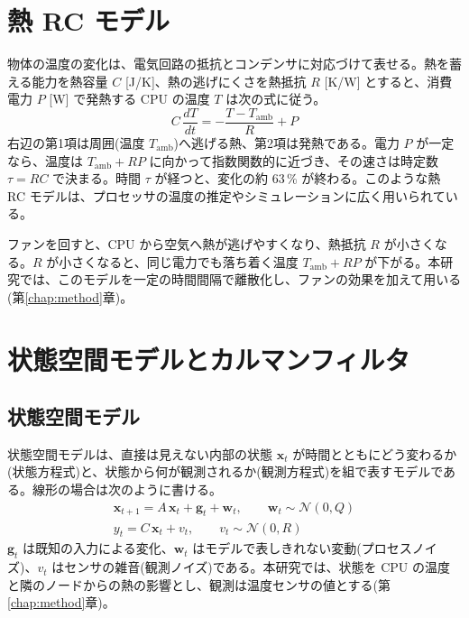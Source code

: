 \section{熱 RC モデル}\label{sec:bg-rc}
物体の温度の変化は、電気回路の抵抗とコンデンサに対応づけて表せる。熱を蓄える能力を熱容量 $C$ [J/K]、熱の逃げにくさを熱抵抗 $R$ [K/W] とすると、消費電力 $P$ [W] で発熱する CPU の温度 $T$ は次の式に従う。
\begin{equation}
  C\,\frac{dT}{dt} = -\frac{T - T_{\mathrm{amb}}}{R} + P
\end{equation}
右辺の第1項は周囲(温度 $T_{\mathrm{amb}}$)へ逃げる熱、第2項は発熱である。電力 $P$ が一定なら、温度は $T_{\mathrm{amb}} + RP$ に向かって指数関数的に近づき、その速さは時定数 $\tau = RC$ で決まる。時間 $\tau$ が経つと、変化の約 63\,\% が終わる。このような熱 RC モデルは、プロセッサの温度の推定やシミュレーションに広く用いられている\cite{skadron2003temperature}。

ファンを回すと、CPU から空気へ熱が逃げやすくなり、熱抵抗 $R$ が小さくなる。$R$ が小さくなると、同じ電力でも落ち着く温度 $T_{\mathrm{amb}} + RP$ が下がる。本研究では、このモデルを一定の時間間隔で離散化し、ファンの効果を加えて用いる(第\ref{chap:method}章)。

\section{状態空間モデルとカルマンフィルタ}\label{sec:bg-kf}
\subsection{状態空間モデル}
状態空間モデルは、直接は見えない内部の状態 $\bm{x}_t$ が時間とともにどう変わるか(状態方程式)と、状態から何が観測されるか(観測方程式)を組で表すモデルである。線形の場合は次のように書ける。
\begin{gather}
  \bm{x}_{t+1} = A\,\bm{x}_t + \bm{g}_t + \bm{w}_t,\qquad \bm{w}_t \sim \mathcal{N}(0, Q) \\
  y_t = C\,\bm{x}_t + v_t,\qquad v_t \sim \mathcal{N}(0, R)
\end{gather}
$\bm{g}_t$ は既知の入力による変化、$\bm{w}_t$ はモデルで表しきれない変動(プロセスノイズ)、$v_t$ はセンサの雑音(観測ノイズ)である。本研究では、状態を CPU の温度と隣のノードからの熱の影響とし、観測は温度センサの値とする(第\ref{chap:method}章)。

